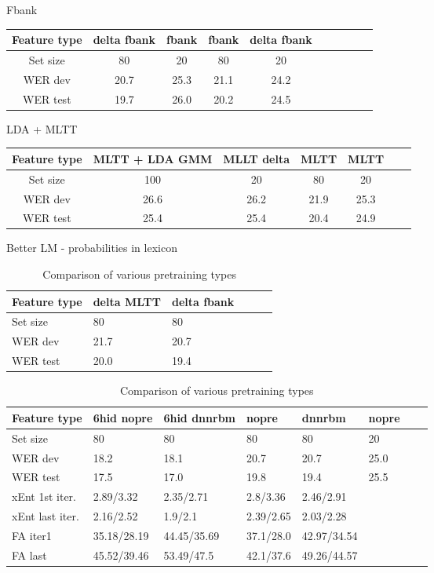 \begin{center}
Fbank \\
\begin{tabular}{ |c|c|c|c|c|c|c|c|c|c| } 
\hline
Feature type & delta fbank & fbank &fbank & delta fbank  \\
\hline
Set size & 80 & 20 & 80 & 20   \\
 \hline
 WER dev & 20.7 & 25.3 & 21.1 & 24.2  \\
 \hline
 WER test & 19.7 & 26.0 & 20.2 & 24.5  \\
 \hline
\end{tabular}

LDA + MLTT \\
\begin{tabular}{ |c|c|c|c|c|c|c| } 
\hline
Feature type & MLTT + LDA GMM & MLLT delta & MLTT & MLTT \\
\hline
Set size & 100 & 20 & 80 & 20 \\
 \hline
 WER dev & 26.6 & 26.2 & 21.9 & 25.3 \\ 
 \hline
 WER test & 25.4 & 25.4 & 20.4 & 24.9  \\
 \hline
\end{tabular}

Better LM - probabilities in lexicon \\
\begin{table}[h!]
\centering
\begin{tabular}{ llllll } 
\hline
Feature type & delta MLTT & delta fbank \\
\hline
Set size &  80 & 80 \\
 \hline
 WER dev &  21.7 & 20.7 \\ 
 \hline
 WER test &  20.0 & 19.4 \\
 \hline
\end{tabular}
\caption{Comparison of various pretraining types}
\end{table}

\begin{table}[h!]
\centering
\begin{tabular}{ llllllll } 
\toprule
Feature type & 6hid nopre & 6hid dnnrbm & nopre & dnnrbm & nopre \\
\midrule
Set size &  80 & 80 & 80 & 80 & 20 \\
WER dev &  18.2 & 18.1 & 20.7 & 20.7 & 25.0  \\ 
WER test &  17.5 & 17.0 & 19.8 & 19.4 & 25.5 \\
xEnt 1st iter. & 2.89/3.32 & 2.35/2.71 &2.8/3.36 &2.46/2.91 & \\
 xEnt last iter.  & 2.16/2.52 & 1.9/2.1 & 2.39/2.65  & 2.03/2.28 & \\
 FA iter1 & 35.18/28.19 & 44.45/35.69 & 37.1/28.0 & 42.97/34.54 & \\
 FA last & 45.52/39.46 & 53.49/47.5 & 42.1/37.6 & 49.26/44.57 & \\
 \bottomrule
\end{tabular}
\caption{Comparison of various pretraining types}
\end{table}


\end{center}
